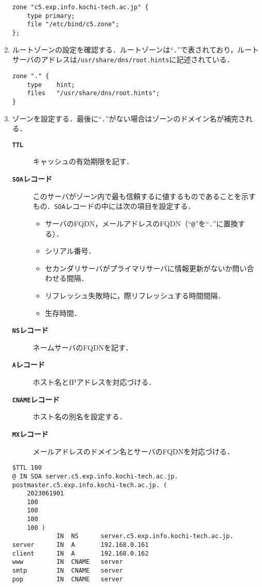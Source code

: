 \begin{enumerate}
\begin{lstlisting}[style=file,caption={\ttfamily /etc/bind/named.conf.local}]
zone "c5.exp.info.kochi-tech.ac.jp" {
    type primary;
    file "/etc/bind/c5.zone";
};
    \end{lstlisting}
    \item ルートゾーンの設定を確認する．ルートゾーンは``\texttt{.}''で表されており，ルートサーバのアドレスは\texttt{/usr/share/dns/root.hints}に記述されている．
          \begin{lstlisting}[caption={\ttfamily /etc/bind/named.conf.default-zones},style=file]
zone "." {
    type    hint;
    files   "/usr/share/dns/root.hints";
}
    \end{lstlisting}
    \item ゾーンを設定する．最後に``\texttt{.}''がない場合はゾーンのドメイン名が補完される．
          \begin{description}
              \item[\bfseries\texttt{TTL}] キャッシュの有効期限を記す．
              \item[\bfseries\texttt{SOA}レコード] このサーバがゾーン内で最も信頼するに値するものであることを示すもの．\texttt{SOA}レコードの中には次の項目を設定する．
                  \begin{itemize}
                      \item サーバのFQDN，メールアドレスのFQDN（``\texttt{@}''を``\texttt{.}''に置換する）．
                      \item シリアル番号．
                      \item セカンダリサーバがプライマリサーバに情報更新がないか問い合わせる間隔．
                      \item リフレッシュ失敗時に，際リフレッシュする時間間隔．
                      \item 生存時間．
                  \end{itemize}
              \item[\bfseries\texttt{NS}レコード] ネームサーバのFQDNを記す．
              \item[\bfseries\texttt{A}レコード]  ホスト名とIPアドレスを対応づける．
              \item[\bfseries\texttt{CNAME}レコード] ホスト名の別名を設定する．
              \item[\bfseries\texttt{MX}レコード] メールアドレスのドメイン名とサーバのFQDNを対応づける．\hfill\cite[p.69\ -\ p.71]{DNSBIND}
          \end{description}
          \begin{lstlisting}[style=file,caption={\ttfamily /etc/bind/c5.zone},language=dns]
$TTL 100
@ IN SOA server.c5.exp.info.kochi-tech.ac.jp. postmaster.c5.exp.info.kochi-tech.ac.jp. (
    2023061901
    100
    100
    100
    100 )
            IN  NS      server.c5.exp.info.kochi-tech.ac.jp.
server      IN  A       192.168.0.161
client      IN  A       192.168.0.162
www         IN  CNAME   server
smtp        IN  CNAME   server
pop         IN  CNAME   server


\end{lstlisting}
\end{enumerate}
